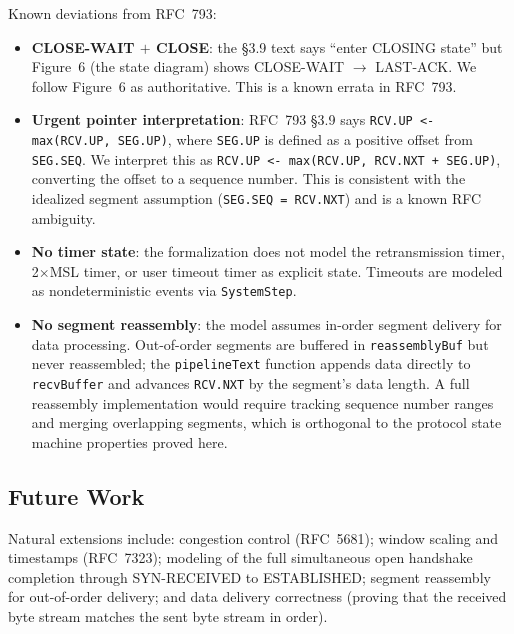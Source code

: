 \documentclass[11pt]{article}
\theoremstyle{definition}
\begin{document}
Known deviations from RFC~793:
\begin{itemize}
  \item \textbf{CLOSE-WAIT $+$ CLOSE}: the \S3.9 text says ``enter CLOSING
    state'' but Figure~6 (the state diagram) shows CLOSE-WAIT $\to$ LAST-ACK.
    We follow Figure~6 as authoritative. This is a known errata in RFC~793.
  \item \textbf{Urgent pointer interpretation}: RFC~793 \S3.9 says
    \texttt{RCV.UP <- max(RCV.UP, SEG.UP)}, where \texttt{SEG.UP} is defined
    as a positive offset from \texttt{SEG.SEQ}. We interpret this as
    \texttt{RCV.UP <- max(RCV.UP, RCV.NXT + SEG.UP)}, converting the offset
    to a sequence number. This is consistent with the idealized segment
    assumption (\texttt{SEG.SEQ = RCV.NXT}) and is a known RFC ambiguity.
  \item \textbf{No timer state}: the formalization does not model the
    retransmission timer, 2$\times$MSL timer, or user timeout timer as
    explicit state. Timeouts are modeled as nondeterministic events via
    \texttt{SystemStep}.
  \item \textbf{No segment reassembly}: the model assumes in-order segment
    delivery for data processing. Out-of-order segments are buffered in
    \texttt{reassemblyBuf} but never reassembled; the \texttt{pipelineText}
    function appends data directly to \texttt{recvBuffer} and advances
    \texttt{RCV.NXT} by the segment's data length. A full reassembly
    implementation would require tracking sequence number ranges and merging
    overlapping segments, which is orthogonal to the protocol state machine
    properties proved here.
\end{itemize}

\subsection{Future Work}

Natural extensions include: congestion control (RFC~5681); window scaling and
timestamps (RFC~7323); modeling of the full simultaneous open handshake
completion through SYN-RECEIVED to ESTABLISHED; segment reassembly for
out-of-order delivery; and data delivery correctness (proving that the
received byte stream matches the sent byte stream in order).



\end{document}
